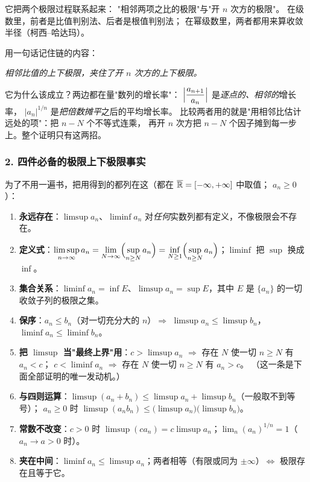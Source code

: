 它把两个极限过程联系起来：
"相邻两项之比的极限"与"开 $n$ 次方的极限"。
在级数里，前者是比值判别法、后者是根值判别法；
在幂级数里，两者都用来算收敛半径（柯西--哈达玛）。

用一句话记住链的内容：

\begin{center}
\emph{相邻比值的上下极限，夹住了开 $n$ 次方的上下极限。}
\end{center}

它为什么该成立？两边都在量"数列的增长率"：
$\Bigl|\dfrac{a_{n+1}}{a_n}\Bigr|$ 是\emph{逐点的、相邻的}增长率，
$|a_n|^{1/n}$ 是\emph{把倍数摊平}之后的平均增长率。
比较两者用的就是"用相邻比估计远处的项"：把 $n-N$ 个不等式连乘，
再开 $n$ 次方把 $n-N$ 个因子摊到每一步上。整个证明只有这两招。

\subsubsection*{2. 四件必备的极限上下极限事实}

为了不用一遍书，把用得到的都列在这（都在 $\overline{\mathbb{R}}=[-\infty,+\infty]$ 中取值；
$a_n\ge0$）：
\begin{enumerate}[label=(F\arabic*), leftmargin=2.6em]
\item \textbf{永远存在}：$\limsup a_n$、$\liminf a_n$ 对\emph{任何}实数列都有定义，不像极限会不存在。
\item \textbf{定义式}：$\displaystyle\limsup_{n\to\infty}a_n=\lim_{N\to\infty}\Bigl(\sup_{n\ge N}a_n\Bigr)
=\inf_{N\ge1}\Bigl(\sup_{n\ge N}a_n\Bigr)$；$\liminf$ 把 $\sup$ 换成 $\inf$。
\item \textbf{集合关系}：$\liminf a_n=\inf E$、$\limsup a_n=\sup E$，其中 $E$ 是 $\{a_n\}$ 的一切收敛子列的极限之集。
\item \textbf{保序}：$a_n\le b_n$（对一切充分大的 $n$）$\Rightarrow$ $\limsup a_n\le\limsup b_n$，$\liminf a_n\le\liminf b_n$。
\item \textbf{把 $\limsup$ 当"最终上界"用}：$c>\limsup a_n$ $\Rightarrow$ 存在 $N$ 使一切 $n\ge N$ 有 $a_n<c$；
$c<\liminf a_n$ $\Rightarrow$ 存在 $N$ 使一切 $n\ge N$ 有 $a_n>c$。
（这一条是下面全部证明的唯一发动机。）
\item \textbf{与四则运算}：$\limsup(a_n+b_n)\le\limsup a_n+\limsup b_n$（一般取不到等号）；
$a_n\ge0$ 时 $\limsup(a_nb_n)\le\bigl(\limsup a_n\bigr)\bigl(\limsup b_n\bigr)$。
\item \textbf{常数不改变}：$c>0$ 时 $\limsup(ca_n)=c\limsup a_n$；$\lim_{n}(a_n)^{1/n}=1$（$a_n\to a>0$ 时）。
\item \textbf{夹在中间}：$\liminf a_n\le\limsup a_n$；两者相等（有限或同为 $\pm\infty$）$\iff$ 极限存在且等于它。
\end{enumerate}

